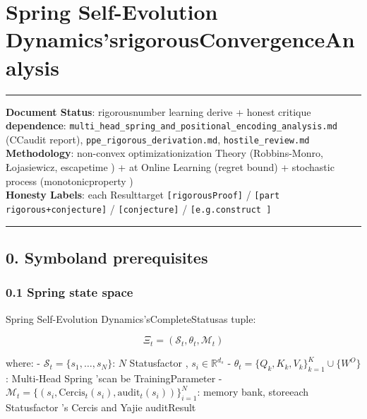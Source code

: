 \documentclass[
  12pt,
]{article}
\author{SCX}
\date{2026}
\begin{document}
\section{Spring
Self-Evolution Dynamics'srigorousConvergenceAnalysis}\label{spring-ux81eaux8fdbux5316ux52a8ux529bux5b66ux7684ux4e25ux5bc6ux6536ux655bux5206ux6790}

\begin{center}\rule{0.5\linewidth}{0.5pt}\end{center}

\textbf{Document Status}: rigorousnumber learning derive + honest critique\\
\textbf{dependence}:
\texttt{multi\_head\_spring\_and\_positional\_encoding\_analysis.md}
(CCaudit report), \texttt{ppe\_rigorous\_derivation.md},
\texttt{hostile\_review.md}\\
\textbf{Methodology}: non-convex optimizationization Theory (Robbins-Monro, Łojasiewicz, escapetime ) +
at Online Learning (regret bound) + stochastic process (monotonicproperty )\\
\textbf{Honesty Labels}: each Resulttarget  \texttt{{[}rigorousProof{]}} /
\texttt{{[}part rigorous+conjecture{]}} / \texttt{{[}conjecture{]}} /
\texttt{{[}e.g.construct {]}}

\begin{center}\rule{0.5\linewidth}{0.5pt}\end{center}

\subsection{0.
Symboland prerequisites}\label{ux7b26ux53f7ux7ea6ux5b9aux4e0eux5148ux5907ux77e5ux8bc6}

\subsubsection{0.1 Spring
state space}\label{spring-ux72b6ux6001ux7a7aux95f4}

Spring Self-Evolution Dynamics'sCompleteStatusas tuple: 

\[\boxed{\Xi_t = (\mathcal{S}_t, \theta_t, \mathcal{M}_t)}\]

where:  - \(\mathcal{S}_t = \{s_1, \ldots, s_N\}\): \(N\)
Statusfactor , \(s_i \in \mathbb{R}^{d_s}\) -
\(\theta_t = \{Q_k, K_k, V_k\}_{k=1}^{K} \cup \{W^O\}\): Multi-Head
Spring 'scan be TrainingParameter -
\(\mathcal{M}_t = \{(s_i, \text{Cercis}_t(s_i), \text{audit}_t(s_i))\}_{i=1}^{N}\): memory bank, storeeach Statusfactor 's
Cercis and Yajie auditResult
\end{document}
